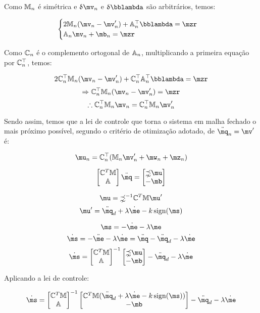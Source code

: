 Como $\mathbb{M}_n$ é sim\'etrica e $\dl \mv_n$ e $\dl \mlambda$ são arbitr\'arios, temos:

$$
\begin{cases}
2 \mM_n (\mv_n - \mv'_n) + \mA_n^\top \mlambda = \mzr \\
\mA_n \mv_n + \mb_n = \mzr
\end{cases}
$$

Como $\mathbb{C}_n$ é o complemento ortogonal de $\mathbb{A}_n$, multiplicando a primeira equa\c{c}\~ao por $\mathbb{C}_n^\top$, temos:

$$ 2 \mC_n^\top \mM_n (\mv_n - \mv'_n) + \mC_n^\top \mA_n^\top \mlambda = \mzr $$
$$ \Rightarrow  \mC_n^\top \mM_n (\mv_n - \mv'_n)  = \mzr $$
$$ \therefore \mC_n^\top \mM_n \mv_n  = \mC_n^\top \mM_n  \mv'_n $$

Sendo assim, temos que a lei de controle que torna o sistema em malha fechado o mais pr\'oximo poss\'ivel, segundo o crit\'erio de otimiza\c{c}\~ao adotado, de $\ddot{\mq}_n = \mv'$ \'e:

$$ \mu_n = \mC_n^\top ( \mM_n \mv'_n + \mw_n + \mz_n ) $$

\newpage



$$
\begin{bmatrix}
\mC^T \mM \\
\mA
\end{bmatrix}
\ddot{\mq}
=
\begin{bmatrix}
\mathbb{\zeta} \mu \\
-\mb
\end{bmatrix}
$$



$$ \mu = \mathbb{\zeta}^{-1} \mC^T \mM \mu' $$
$$ \mu' = \ddot{\mq}_d + \lambda \dot{\me} - k  \sign (\ms) $$

$$ \ms = - \dot{\me} - \lambda \me $$
$$ \dot{\ms} = - \ddot{\me} - \lambda \dot{\me} = \ddot{\mq} - \ddot{\mq}_d  - \lambda \dot{\me} $$
$$ \dot{\ms} =  \begin{bmatrix}
\mC^T \mM \\
\mA
\end{bmatrix}^{-1}
\begin{bmatrix}
\mathbb{\zeta} \mu \\
-\mb
\end{bmatrix}
 - \ddot{\mq}_d  - \lambda \dot{\me} $$
 
Aplicando a lei de controle:

$$ \dot{\ms} =  \begin{bmatrix}
\mC^T \mM \\
\mA
\end{bmatrix}^{-1}
\begin{bmatrix}
 \mC^T \mM (\ddot{\mq}_d + \lambda \dot{\me} - k  \sign (\ms)) \\
-\mb
\end{bmatrix}
 - \ddot{\mq}_d  - \lambda \dot{\me} $$
 
